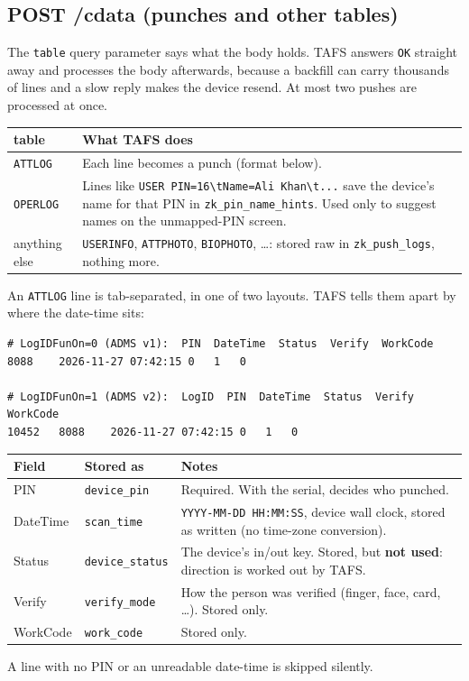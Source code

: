 \documentclass[11pt]{article}
\begin{document}
\subsection{POST /cdata (punches and other tables)}
The \texttt{table} query parameter says what the body holds. TAFS answers \texttt{OK} straight away and processes the
body afterwards, because a backfill can carry thousands of lines and a slow reply makes the device resend. At most two
pushes are processed at once.
\begin{center}
\begin{tabularx}{\textwidth}{@{}l L@{}}
\toprule
\textbf{table} & \textbf{What TAFS does} \\
\midrule
\texttt{ATTLOG} & Each line becomes a punch (format below). \\
\texttt{OPERLOG} & Lines like \texttt{USER PIN=16\textbackslash tName=Ali Khan\textbackslash t...} save the device's name
  for that PIN in \texttt{zk\_pin\_name\_hints}. Used only to suggest names on the unmapped-PIN screen. \\
anything else & \texttt{USERINFO}, \texttt{ATTPHOTO}, \texttt{BIOPHOTO}, \ldots: stored raw in \texttt{zk\_push\_logs},
  nothing more. \\
\bottomrule
\end{tabularx}
\end{center}
An \texttt{ATTLOG} line is tab-separated, in one of two layouts. TAFS tells them apart by where the date-time sits:
\begin{lstlisting}
# LogIDFunOn=0 (ADMS v1):  PIN  DateTime  Status  Verify  WorkCode
8088	2026-11-27 07:42:15	0	1	0

# LogIDFunOn=1 (ADMS v2):  LogID  PIN  DateTime  Status  Verify  WorkCode
10452	8088	2026-11-27 07:42:15	0	1	0
\end{lstlisting}
\begin{center}
\begin{tabularx}{\textwidth}{@{}l l L@{}}
\toprule
\textbf{Field} & \textbf{Stored as} & \textbf{Notes} \\
\midrule
PIN & \texttt{device\_pin} & Required. With the serial, decides who punched. \\
DateTime & \texttt{scan\_time} & \texttt{YYYY-MM-DD HH:MM:SS}, device wall clock, stored as written (no time-zone conversion). \\
Status & \texttt{device\_status} & The device's in/out key. Stored, but \textbf{not used}: direction is worked out by TAFS. \\
Verify & \texttt{verify\_mode} & How the person was verified (finger, face, card, \ldots). Stored only. \\
WorkCode & \texttt{work\_code} & Stored only. \\
\bottomrule
\end{tabularx}
\end{center}
A line with no PIN or an unreadable date-time is skipped silently.
\end{document}
